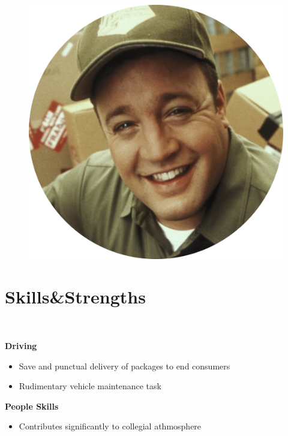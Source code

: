 \documentclass[]{friggeri-cv-theme}
\begin{document}
\begin{aside}
  ~

\vspace{-3.5cm}
\begin{figure}[ht]
	\hspace{0.3cm}
	\includegraphics[width=.71\linewidth]{img/Doug.png}
\end{figure}

\newcommand{\skillspace}{\vspace*{-0.75mm}}
  \vspace{-2.9mm}
  \section{Skills\thinspace \&\thinspace Strengths}\\
  \vspace{3.5mm}
    
	\textbf{Driving}\\\vspace{0.4mm}
	\begin{itemize}[leftmargin=*, noitemsep]
	\item Save and punctual delivery of packages to end consumers
	\item Rudimentary vehicle maintenance task\\
	\end{itemize}	

  	\skillspace
    	\textbf{People Skills}\\\vspace{0.2mm}
	\begin{itemize}[leftmargin=*, noitemsep]	
	\item Contributes significantly to collegial athmosphere\\
	\end{itemize}	


\end{aside}
\end{document}
